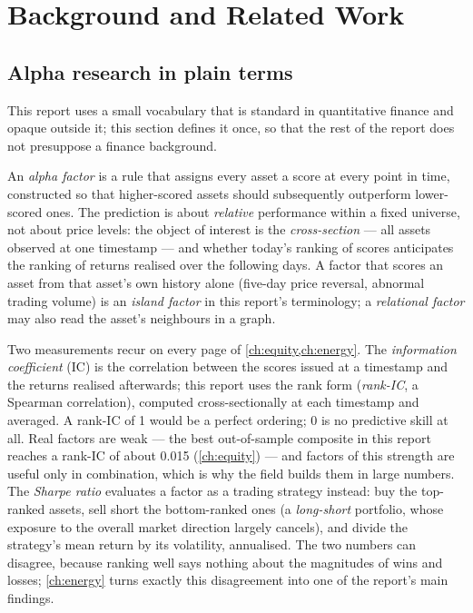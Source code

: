 \chapter{Background and Related Work}
\label{ch:background}

\section{Alpha research in plain terms}
\label{sec:bg-primer}

This report uses a small vocabulary that is standard in quantitative
finance and opaque outside it; this section defines it once, so that
the rest of the report does not presuppose a finance background.

An \emph{alpha factor} is a rule that assigns every asset a score at
every point in time, constructed so that higher-scored assets should
subsequently outperform lower-scored ones. The prediction is about
\emph{relative} performance within a fixed universe, not about price
levels: the object of interest is the \emph{cross-section} --- all
assets observed at one timestamp --- and whether today's ranking of
scores anticipates the ranking of returns realised over the following
days. A factor that scores an asset from that asset's own history
alone (five-day price reversal, abnormal trading volume) is an
\emph{island factor} in this report's terminology; a \emph{relational
factor} may also read the asset's neighbours in a graph.

Two measurements recur on every page of \cref{ch:equity,ch:energy}.
The \emph{information coefficient} (IC) is the correlation between the
scores issued at a timestamp and the returns realised afterwards; this
report uses the rank form (\emph{rank-IC}, a Spearman correlation),
computed cross-sectionally at each timestamp and averaged. A rank-IC
of 1 would be a perfect ordering; 0 is no predictive skill at all.
Real factors are weak --- the best out-of-sample composite in this
report reaches a rank-IC of about 0.015 (\cref{ch:equity}) --- and
factors of this strength are useful only in combination, which is why
the field builds them in large numbers. The \emph{Sharpe ratio}
evaluates a factor as a trading strategy instead: buy the top-ranked
assets, sell short the bottom-ranked ones (a \emph{long-short}
portfolio, whose exposure to the overall market direction largely
cancels), and divide the strategy's mean return by its volatility,
annualised. The two numbers can disagree, because ranking well says
nothing about the magnitudes of wins and losses; \cref{ch:energy}
turns exactly this disagreement into one of the report's main
findings.

